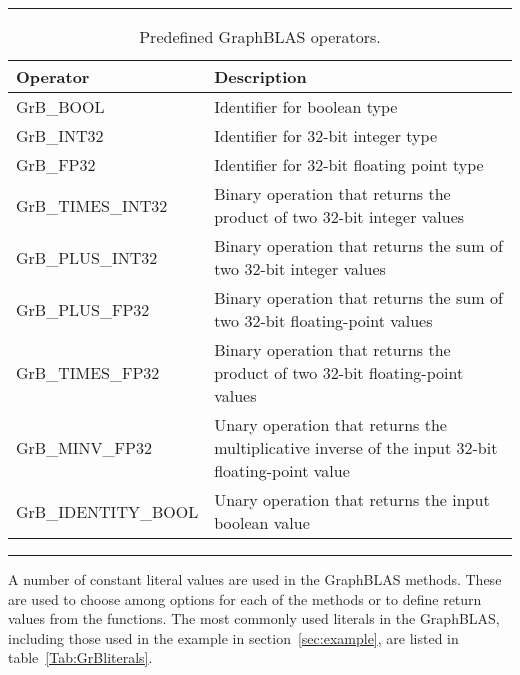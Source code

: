 \begin{table}[h]
\hrule
\begin{center}
\caption{Predefined GraphBLAS operators.}
\label{Tab:GrBops}
\begin{tabular}{lp{5.25cm}}
Operator                           & Description  \\
\hline
	{\sf GrB\_BOOL}		   & Identifier for boolean type \\
	{\sf GrB\_INT32}	   & Identifier for 32-bit integer type \\
	{\sf GrB\_FP32}		   & Identifier for 32-bit floating point type \\
	{\sf GrB\_TIMES\_INT32}    & Binary operation that returns the product of two 32-bit integer values \\
	{\sf GrB\_PLUS\_INT32}     & Binary operation that returns the sum of two 32-bit integer values \\
	{\sf GrB\_PLUS\_FP32}      & Binary operation that returns the sum of two 32-bit floating-point values \\
	{\sf GrB\_TIMES\_FP32}     & Binary operation that returns the product of two 32-bit floating-point values \\
	{\sf GrB\_MINV\_FP32}      & Unary operation that returns the multiplicative inverse of the input 32-bit floating-point value \\
	{\sf GrB\_IDENTITY\_BOOL}  & Unary operation that returns the input boolean value \\
\end{tabular}
\end{center}
\hrule
\end{table}
A number of constant literal values are used in the GraphBLAS methods.  These are used to 
choose among options for each of the methods or to define return values from the functions.
The most commonly used literals in the GraphBLAS, including those used in the example in 
section~\ref{sec:example}, are listed in table~\ref{Tab:GrBliterals}.
